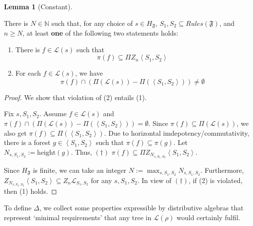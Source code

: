 \documentclass[sigplan,9pt]{acmart}\settopmatter{printfolios=true,printccs=false,printacmref=false}
\newcounter{thm}
\newcounter{theorem}
\theoremstyle{definition}
\newtheorem{llemma}[thm]{Lemma}
\newcommand{\N}[0]{{\mathbb{N}}}
\newcommand{\La}[0]{{\mathcal{L}}}
\newcommand{\Ff}[0]{{\mathfrak{F}}}
\newcommand{\height}[0]{\text{height}}
\begin{document}
\begin{llemma}[Constant]\label{lemma:absorption}

There is $N \in \N$ such that, for any choice of $s \in H_\Ff$, $S_1, S_2 \subseteq Rules(\Ff)$, %
and $n \geq N$, at least \textbf{one} of the following two statements holds: %

\begin{enumerate}
\item There is $f \in \La(s)$ such that $$\pi(f) \subseteq \Pi Z_n \left\langle S_1,S_2\right\rangle$$
\item For each $f \in \La(s)$, we have $$\pi(f) \cap (\Pi(\La(s)) - \Pi(\left\langle S_1,S_2\right\rangle)) \neq \emptyset$$
\end{enumerate}
\end{llemma}

\begin{proof}
We show that violation of (2) entails (1).

Fix $s, S_1, S_2$.
Assume $f \in \La(s)$ and $\pi(f) \cap (\Pi(\La(s)) - \Pi(\left\langle S_1,S_2\right\rangle)) = \emptyset$.
Since $\pi(f) \subseteq \Pi(\La(s))$, we also get $\pi(f) \subseteq \Pi(\left\langle S_1,S_2\right\rangle)$.
Due to horizontal imdepotency/commutativity, there is a forest $g \in \left\langle S_1,S_2\right\rangle$ such that $\pi(f) \subseteq \pi(g)$.
Let $N_{s,S_1,S_2} := \height(g)$.
Thus,  $(\dagger)$ $\pi(f) \subseteq \Pi Z_{N_{s,S_1,S_2}} \left\langle S_1,S_2\right\rangle$.

Since $H_\Ff$ is finite, we can take an integer $N := \max_{s,S_1,S_2} N_{s,S_1,S_2}$.
Furthermore, $Z_{N_{s,S_1,S_2}} \left\langle S_1,S_2\right\rangle \subseteq Z_n \La_{S_1,S_2}$ for any $s, S_1, S_2$.
In view of $(\dagger)$, if (2) is violated, then (1) holds.
\end{proof}






To define $\Delta$, we collect some properties expressible by distributive algebras that represent `minimal requirements' that any tree in $\La(\rho)$ would certainly fulfil.
\end{document}

